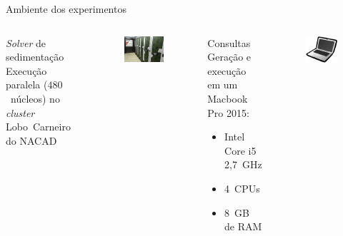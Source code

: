 \documentclass[12pt,compress,final]{beamer}
\begin{document}
\begin{frame}{Ambiente dos experimentos}

\begin{columns}[t]


\vspace{-.7cm}

\begin{block}{\textit{Solver} de sedimentação}
Execução paralela ($480$~núcleos) no \textit{cluster} Lobo~Carneiro do NACAD\footnotemark{}
\end{block}

\begin{figure}
\includegraphics[width=\textwidth]{img/loboc.jpg}
\end{figure}



\vspace{-.7cm}

\begin{block}{Consultas}
Geração e execução em um Macbook Pro 2015:

\begin{itemize}
\item Intel Core i5 2,7~GHz
\item 4~CPUs
\item 8~GB de RAM
\end{itemize}
\end{block}

\begin{figure}
\includegraphics[width=.5\textwidth]{img/macbook.png}
\end{figure}


\end{columns}
\end{frame}
\end{document}
